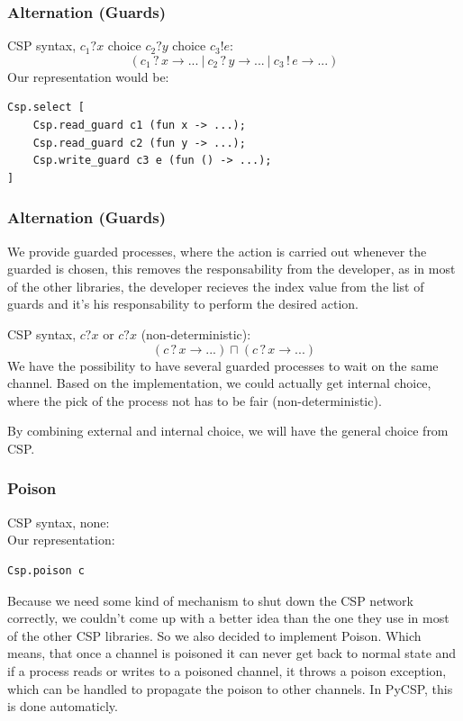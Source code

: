 \documentclass{beamer}
\begin{document}
\begin{frame}[fragile]
  \frametitle{Alternation (Guards)}
  CSP syntax, $c_1?x$ choice $c_2?y$ choice $c_3!e$:
  \[(c_1\,?\,x \to ...\ |\ c_2\,?\,y \to ...\ |\ c_3\,!\,e \to ...)\]
  Our representation would be:
\scriptsize
\begin{verbatim}
Csp.select [
    Csp.read_guard c1 (fun x -> ...);
    Csp.read_guard c2 (fun y -> ...);
    Csp.write_guard c3 e (fun () -> ...);
]
\end{verbatim}
\normalsize
\end{frame}

\begin{frame}[fragile]
  \frametitle{Alternation (Guards)}
  We provide guarded processes, where the action is carried out whenever
  the guarded is chosen, this removes the responsability from the developer,
  as in most of the other libraries, the developer recieves the index value
  from the list of guards and it's his responsability to perform the desired
  action.

  CSP syntax, $c?x$ or $c?x$ (non-deterministic):
  \[(c\,?\,x \to ...) \sqcap (c\,?\,x \to ...)\]
  We have the possibility to have several guarded processes to wait on the same
  channel. Based on the implementation, we could actually get internal choice,
  where the pick of the process not has to be fair (non-deterministic).

  By combining external and internal choice, we will have the general choice
  from CSP.
\end{frame}


\begin{frame}[fragile]
  \frametitle{Poison}
  CSP syntax, none:
  \[\]
  Our representation:
\scriptsize
\begin{verbatim}
Csp.poison c 
\end{verbatim}
\normalsize
Because we need some kind of mechanism to shut down the CSP network correctly,
we couldn't come up with a better idea than the one they use in most of the
other CSP libraries. So we also decided to implement Poison. Which means, that
once a channel is poisoned it can never get back to normal state and if a
process reads or writes to a poisoned channel, it throws a poison exception,
which can be handled to propagate the poison to other channels. In PyCSP, this
is done automaticly.
\end{frame}
\end{document}
